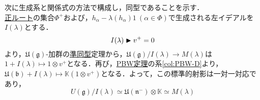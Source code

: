 \documentclass[rep_main]{subfiles}
\begin{document}
次に生成系と関係式の方法で構成し，同型であることを示す．\\
\hyperref[def:base-root]{正ルート}の集合$\Phi^+$および，$h_\alpha - \lambda(h_\alpha)1\ (\alpha \in \Phi)$で生成される左イデアルを$I(\lambda)$とする．
\begin{equation}
	I(\lambda) \blacktriangleright v^+ = 0
\end{equation}
より，$\mathfrak{U}(\mathfrak{g})$-加群の\hyperref[g-module-hom]{準同型}定理から，$\mathfrak{U}(\mathfrak{g}) / I(\lambda) \to M(\lambda)$は$1 + I(\lambda) \mapsto 1\otimes v^+$となる．再び，\hyperref[thm:PBW]{PBW定理}の系\ref{col:PBW-D}より，$\mathfrak{U}(\mathfrak{b}) + I(\lambda) \mapsto \mathbb{K}(1\otimes v^+)$となる．よって，この標準的射影は一対一対応であり，
\begin{equation}
	U(\mathfrak{g}) / I(\lambda) \simeq \mathfrak{U}(\mathfrak{n}^-) \otimes \mathbb{K} \simeq M(\lambda)
\end{equation}
\end{document}
